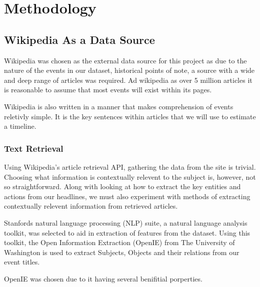 \documentclass[bsc,frontabs,twoside,singlespacing,parskip,deptreport]{infthesis}     %
\begin{document}

\chapter{Methodology}


\section{Wikipedia As a Data Source}%
Wikipedia was chosen as the external data source for this project as
due to the nature of the events in our dataset, historical points of note,
a source with a wide and deep range of articles was required.
Ad wikipedia as over 5 million articles \cite{} it is reasonable to assume
that most events will exist within its pages.

Wikipedia is also written in a manner that makes comprehension of events reletivly simple.
It is the key sentences within articles that we will use to estimate a timeline.

\subsection{Text Retrieval}
Using Wikipedia's article retrieval API, gathering the data from
the site is trivial.
Choosing what information is contextually relevent to the subject is, however, not so straightforward.
Along with looking at how to extract the key entities and actions from our 
headlines, we must also experiment with methods of extracting contextually relevent information from
retrieved articles.

Stanfords natural language processing (NLP) suite,
a natural language analysis toolkit,
was selected to aid in extraction of features from the dataset.
Using this toolkit, the Open Information Extraction (OpenIE) from
The University of Washington is used to extract Subjects, Objects
and their relations from our event titles.

OpenIE was chosen due to it having several benifitial porperties.
\end{document}
